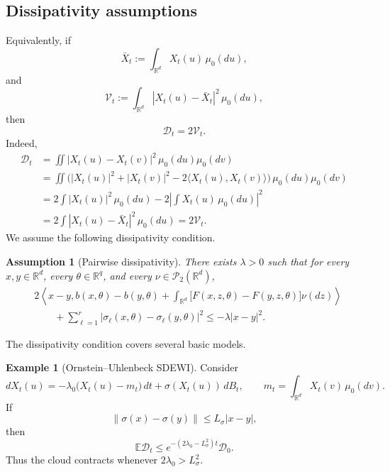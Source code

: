 \documentclass{tsp-short}
\newtheorem{assumption}{Assumption}
\theoremstyle{remark}
\theoremstyle{definition}
\newtheorem{example}{Example}[section]
\newcommand{\R}{\mathbb{R}} %
\newcommand{\cP}{\mathcal{P}} %
\newcommand{\E}{\mathbb E} %
\begin{document}
\subsection{Dissipativity assumptions}\label{subsec:dissipativity-assumptions}
Equivalently, if
\begin{equation*}
	\bar X_t:=\int_{\R^d}X_t(u)\,\mu_0(du),
\end{equation*}
and
\begin{equation*}
	\mathcal V_t := \int_{\R^d}|X_t(u)-\bar X_t|^2\,\mu_0(du),
\end{equation*}
then
\begin{equation*}
	\mathcal D_t=2\mathcal V_t.
\end{equation*}
Indeed,
\begin{align*}
	\mathcal D_t & = \iint |X_t(u)-X_t(v)|^2\,\mu_0(du)\mu_0(dv)                                                \\
	             & = \iint \big( |X_t(u)|^2+|X_t(v)|^2 -2\langle X_t(u),X_t(v)\rangle \big)\,\mu_0(du)\mu_0(dv) \\
	             & = 2\int |X_t(u)|^2\,\mu_0(du)- 2\left|\int X_t(u)\,\mu_0(du)\right|^2                        \\
	             & = 2\int |X_t(u)-\bar X_t|^2\,\mu_0(du)= 2\mathcal V_t.
\end{align*}
We assume the following dissipativity condition.
\begin{assumption}[Pairwise dissipativity]\label{ass:pairwise-dissipativity}
	There exists \(\lambda>0\) such that for every \(x,y\in\R^d\), every \(\theta\in\R^q\), and every
	\(\nu\in\cP_2(\R^d)\),
	\begin{align*}
		 & 2\left\langle x-y, b(x,\theta)-b(y,\theta) + \int_{\R^d} \big[F(x,z,\theta)-F(y,z,\theta)\big] \nu(dz) \right\rangle \\
		 & \qquad + \sum_{\ell=1}^r |\sigma_\ell(x,\theta)-\sigma_\ell(y,\theta)|^2 \le -\lambda |x-y|^2.
	\end{align*}
\end{assumption}

The dissipativity condition covers several basic models.

\begin{example}[Ornstein--Uhlenbeck SDEWI]
	Consider
	\begin{equation*}
		dX_t(u)= -\lambda_0\big(X_t(u)-m_t\big)\,dt + \sigma(X_t(u))\,dB_t, \qquad m_t=\int_{\R^d} X_t(v)\,\mu_0(dv).
	\end{equation*}
	If
	\begin{equation*}
		\|\sigma(x)-\sigma(y)\| \le L_\sigma |x-y|,
	\end{equation*}
	then
	\begin{equation*}
		\E\mathcal D_t \le e^{-(2\lambda_0-L_\sigma^2)t}\mathcal D_0.
	\end{equation*}
	Thus the cloud contracts whenever \(2\lambda_0>L_\sigma^2\).
\end{example}
\end{document}
